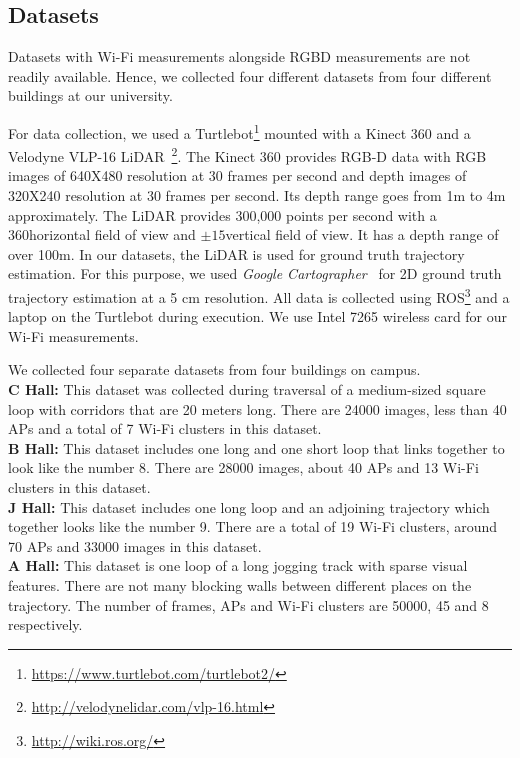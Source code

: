 \subsection{Datasets}
\label{subsec:dataset}
Datasets with Wi-Fi measurements alongside RGBD measurements are not readily available. 
Hence, we collected four different datasets from four different buildings at our university.

For data collection, we used a Turtlebot\footnote{\url{https://www.turtlebot.com/turtlebot2/}} mounted with a Kinect 360 and a Velodyne VLP-16 LiDAR~\footnote{\url{http://velodynelidar.com/vlp-16.html}}. 
The Kinect 360 provides RGB-D data with RGB images of 640X480 resolution at 30 frames per second and depth images of 320X240 resolution at 30 frames per second. 
Its depth range goes from 1m to 4m approximately. The LiDAR provides 300,000 points per second with a 360\degree horizontal field of view and $\pm 15$\degree vertical field of view. 
It has a depth range of over 100m. 
In our datasets, the LiDAR is used for ground truth trajectory estimation. 
For this purpose, we used {\it Google Cartographer}~\cite{cartographer} for 2D ground truth trajectory estimation at a 5 cm resolution. %
All data is collected using ROS\footnote{\url{http://wiki.ros.org/}} and a laptop on the Turtlebot during execution. We use Intel 7265 wireless card for our Wi-Fi measurements.

We collected four separate datasets from four buildings on campus. \\
\textbf{C Hall:} This dataset was collected during traversal of a medium-sized square loop with corridors that are 20 meters long. There are 24000 images, less than 40 APs and a total of 7 Wi-Fi clusters in this dataset.\\
\textbf{B Hall:} This dataset includes one long and one short loop that links together to look like the number 8. There are 28000 images, about 40 APs and 13 Wi-Fi clusters in this dataset.\\
\textbf{J Hall:} This dataset includes one long loop and an adjoining trajectory which together looks like the number 9. There are a total of 19 Wi-Fi clusters, around 70 APs and 33000 images in this dataset.\\
\textbf{A Hall:} This dataset is one loop of a long jogging track with sparse visual features. There are not many blocking walls between different places on the trajectory. The number of frames, APs and Wi-Fi clusters are 50000, 45 and 8 respectively.
